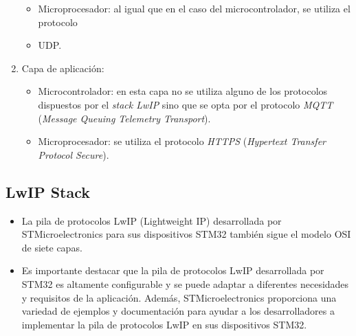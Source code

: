 \begin{enumerate}
\begin{itemize}
      \item Microprocesador: al igual que en el caso del microcontrolador, se utiliza el protocolo \item{UDP}.

    \end{itemize}
    
  
  \item Capa de aplicación: 

    \begin{itemize}

      \item Microcontrolador: en esta capa no se utiliza alguno de los protocolos dispuestos por el \textit{stack LwIP} sino que se opta por el protocolo \textit{MQTT} (\textit{Message Queuing Telemetry Transport}).

      \item Microprocesador: se utiliza el protocolo \textit{HTTPS} (\textit{Hypertext Transfer Protocol Secure}).

    \end{itemize}



\end{enumerate}

    
\subsection{LwIP Stack}

\begin{itemize}

  \item La pila de protocolos LwIP (Lightweight IP) desarrollada por STMicroelectronics para sus dispositivos STM32 también sigue el modelo OSI de siete capas.

  \item Es importante destacar que la pila de protocolos LwIP desarrollada por STM32 es altamente configurable y se puede adaptar a diferentes necesidades y requisitos de la aplicación. Además, STMicroelectronics proporciona una variedad de ejemplos y documentación para ayudar a los desarrolladores a implementar la pila de protocolos LwIP en sus dispositivos STM32.

\end{itemize}


